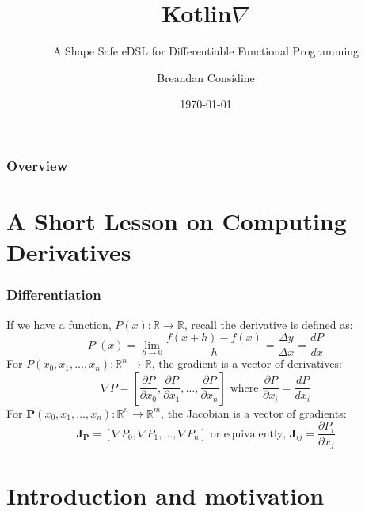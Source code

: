 \documentclass{beamer}
\title{Kotlin\texorpdfstring{$\nabla$}{}}
\subtitle{A Shape Safe eDSL for Differentiable Functional Programming}
\author{Breandan Considine}
\institute[UdeM]{
Universit\'e de Montr\'eal \\
\medskip
\textit{breandan.considine@umontreal.ca}
}
\date{\today}
\begin{document}
    \begin{frame}
        \titlepage
    \end{frame}

    \begin{frame}
        \frametitle{Overview}
        \tableofcontents
    \end{frame}

    \section{A Short Lesson on Computing Derivatives}\label{sec:second-section}


    \begin{frame}
        \frametitle{Differentiation}
        If we have a function, $P(x): \mathbb{R}\rightarrow\mathbb{R}$, recall the derivative is defined as:
        \begin{equation}
            P'(x) = \lim _{h\to 0}{\frac {f(x+h)-f(x)}{h}} = \frac{\Delta y}{\Delta x} = \frac{dP}{dx}
        \end{equation}
        For $P(x_0, x_1, \dots, x_n): \mathbb{R}^n\rightarrow\mathbb{R}$, the gradient is a vector of derivatives:
        \begin{equation}
            \nabla P = \left[\frac{\partial P}{\partial x_0}, \frac{\partial P}{\partial x_1}, \dots, \dfrac{\partial P}{\partial x_n}\right]\text{ where }\frac{\partial P}{\partial x_i} = \frac{dP}{dx_i}
        \end{equation}
        For $\mathbf{P}(x_0, x_1, \dots, x_n): \mathbb{R}^n\rightarrow\mathbb{R}^m$, the Jacobian is a vector of gradients:
        \begin{equation}
            \mathbf{J}_\mathbf{P} = \left[\nabla P_0, \nabla P_1, \dots, \nabla P_n \right] \text{ or equivalently, } \mathbf{J}_{ij} = \frac{\partial P_i}{\partial x_j}
        \end{equation}
    \end{frame}


    \section{Introduction and motivation}\label{sec:first-section}
\end{document}
